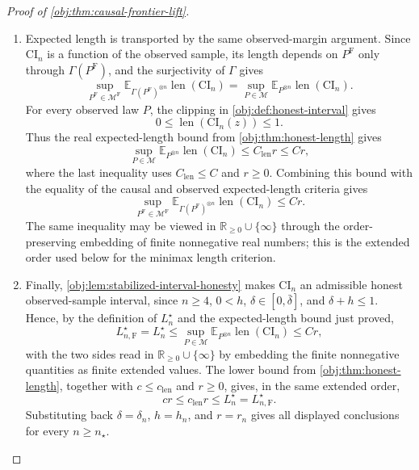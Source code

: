 \begin{proof}[Proof of \cref{obj:thm:causal-frontier-lift}]
\begin{enumerate}
\item Expected length is transported by the same observed-margin argument.  Since
\(\mathrm{CI}_n\) is a function of the observed sample, its length depends on
\(P^{\mathrm F}\) only through \(\Gamma(P^{\mathrm F})\), and the surjectivity of
\(\Gamma\) gives
\[
\sup_{P^{\mathrm F}\in\mathcal M^{\mathrm F}}
\mathbb E_{\Gamma(P^{\mathrm F})^{\otimes n}}
\operatorname{len}(\mathrm{CI}_n)
=
\sup_{P\in\mathcal M}
\mathbb E_{P^{\otimes n}}
\operatorname{len}(\mathrm{CI}_n).
\]
For every observed law \(P\), the clipping in \cref{obj:def:honest-interval}
gives
\[
0\le \operatorname{len}(\mathrm{CI}_n(z))\le 1.
\]
Thus the real expected-length bound from \cref{obj:thm:honest-length} gives
\[
\sup_{P\in\mathcal M}
\mathbb E_{P^{\otimes n}}
\operatorname{len}(\mathrm{CI}_n)
\le
C_{\mathrm{len}} r
\le
C r,
\]
where the last inequality uses \(C_{\mathrm{len}}\le C\) and \(r\ge0\).  Combining
this bound with the equality of the causal and observed expected-length criteria gives
\[
\sup_{P^{\mathrm F}\in\mathcal M^{\mathrm F}}
\mathbb E_{\Gamma(P^{\mathrm F})^{\otimes n}}
\operatorname{len}(\mathrm{CI}_n)
\le
C r.
\]
The same inequality may be viewed in \(\mathbb R_{\ge0}\cup\{\infty\}\) through
the order-preserving embedding of finite nonnegative real numbers; this is the
extended order used below for the minimax length criterion. %

\item Finally, \cref{obj:lem:stabilized-interval-honesty} makes
\(\mathrm{CI}_n\) an admissible honest observed-sample interval, since
\(n\ge4\), \(0<h\), \(\delta\in[0,\bar\delta]\), and \(\delta+h\le1\).  Hence,
by the definition of \(L_n^\star\) and the expected-length bound just proved,
\[
L_{n,\mathrm F}^\star
=
L_n^\star
\le
\sup_{P\in\mathcal M}
\mathbb E_{P^{\otimes n}}
\operatorname{len}(\mathrm{CI}_n)
\le
C r,
\]
with the two sides read in \(\mathbb R_{\ge0}\cup\{\infty\}\) by embedding the
finite nonnegative quantities as finite extended values.  The lower bound from
\cref{obj:thm:honest-length}, together with \(c\le c_{\mathrm{len}}\) and
\(r\ge0\), gives, in the same extended order,
\[
c r
\le
c_{\mathrm{len}} r
\le
L_n^\star
=
L_{n,\mathrm F}^\star .
\]
Substituting back \(\delta=\delta_n\), \(h=h_n\), and \(r=r_n\) gives all
displayed conclusions for every \(n\ge n_\star\). %
\end{enumerate}
\end{proof}

